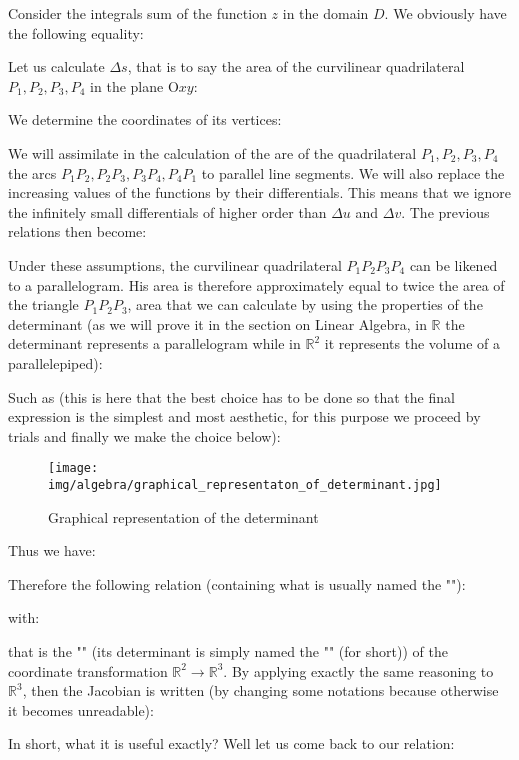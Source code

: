 	Consider the integrals sum of the function $z$ in the domain $D$. We obviously have the following equality:
	
	Let us calculate $\Delta s$, that is to say the area of the curvilinear quadrilateral $P_1,P_2,P_3,P_4$ in the plane $\text{O}xy$:
	
	We determine the coordinates of its vertices:
	
	
	We will assimilate in the calculation of the are of the quadrilateral  $P_1,P_2,P_3,P_4$ the arcs $P_1P_2,P_2P_3,P_3P_4,P_4P_1$ to parallel line segments. We will also replace the increasing values of the functions by their differentials. This means that we ignore the infinitely small differentials of higher order than $\Delta u$ and $\Delta v$. The previous relations then become:
	

	Under these assumptions, the curvilinear quadrilateral $P_1P_2P_3P_4$ can be likened to a parallelogram. His area is therefore approximately equal to twice the area of the triangle $P_1P_2P_3$, area that we can calculate by using the properties of the determinant (as we will prove it in the section on Linear Algebra, in $\mathbb{R}$ the determinant  represents a parallelogram while in $\mathbb{R}^2$ it represents the volume of a parallelepiped):
	
	Such as (this is here that the best choice has to be done so that the final expression is the simplest and most aesthetic, for this purpose we proceed by trials and finally we make the choice below):
	\begin{figure}[H]
		\centering
		\texttt{[image: img/algebra/graphical\_representaton\_of\_determinant.jpg]}
		\caption{Graphical representation of the determinant}
	\end{figure}

	Thus we have:
	
	Therefore the following relation (containing what is usually named the ""):
	
	with:
	
	that is the "" (its determinant is simply named the "" (for short)) of the coordinate transformation $\mathbb{R}^2 \rightarrow \mathbb{R}^3$. By applying exactly the same reasoning to $\mathbb{R}^3$, then the Jacobian is written (by changing some notations because otherwise it becomes unreadable):
	
	In short, what it is useful exactly? Well let us come back to our relation:
	
